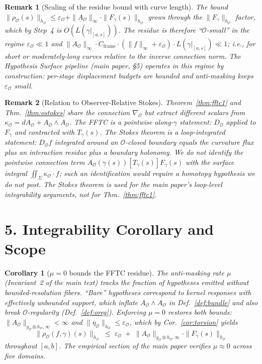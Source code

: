 \documentclass[11pt]{article}
\newtheorem{corollary}{Corollary}
\newtheorem{remark}{Remark}
\newcommand{\Obs}{\mathcal{O}}
\newcommand{\Eps}{\varepsilon_{\Obs}}
\newcommand{\kappaO}{\kappa_{\Obs}}
\newcommand{\resO}{\rho_{\Obs}}
\newcommand{\nablaO}{\nabla_{\Obs}}
\newcommand{\AO}{A_{\Obs}}
\newcommand{\gO}{g_{\Obs}}
\newcommand{\hO}{h_{\Obs}}
\newcommand{\mask}{\mu}
\newcommand{\DO}{D_{\Obs}}
\newcommand{\Cframe}{C_{\mathrm{frame}}}
\begin{document}
\begin{remark}[Scaling of the residue bound with curve length]
\label{rem:residue-scale}
The bound $\|\resO(s)\|_{\hO} \leq \Eps + \|\AO\|_\infty \cdot \|F_\gamma(s)\|_{\hO}$
grows through the $\|F_\gamma\|_{\hO}$ factor, which by Step~4 is
$O(L(\gamma|_{[a,s]}))$. The residue is therefore ``$\Obs$-small'' in
the regime $\Eps \ll 1$ and
$\|\AO\|_\infty \cdot \Cframe \cdot (\|f\|_\infty + \Eps) \cdot L(\gamma|_{[a,s]}) \ll 1$;
i.e., for short or moderately-long curves relative to the inverse
connection norm. The Hypothesis Surface pipeline (main paper, \S5)
operates in this regime by construction: per-stage displacement
budgets are bounded and anti-masking keeps $\Eps$ small.
\end{remark}

\begin{remark}[Relation to Observer-Relative Stokes]
\label{rem:stokes-relation}
Theorem~\ref{thm:fftc1} and Thm.~\ref{thm:ostokes} share the
connection $\nablaO$ but extract different scalars from
$\kappaO = d\AO + \AO \wedge \AO$. The FFTC is a \emph{pointwise
along-$\gamma$} statement: $\DO$ applied to $F_\gamma$ and contracted
with $T_\gamma(s)$. The Stokes theorem is a \emph{loop-integrated}
statement: $\DO f$ integrated around an $\Obs$-closed boundary
equals the curvature flux plus an interaction residue plus a
boundary holonomy. We do \emph{not} identify the pointwise
connection term $\AO(\gamma(s))[T_\gamma(s)] F_\gamma(s)$ with the
surface integral $\iint_\Sigma \kappaO \cdot f$; such an
identification would require a homotopy hypothesis we do not post.
The Stokes theorem is used for the main paper's loop-level
integrability arguments, not for Thm.~\ref{thm:fftc1}.
\end{remark}

\section*{5. Integrability Corollary and Scope}

\begin{corollary}[$\mask = 0$ bounds the FFTC residue]
\label{cor:mask}
The anti-masking rate $\mask$ (Invariant~2 of the main text) tracks
the fraction of hypotheses emitted without bounded-resolution fibers.
``Bare'' hypotheses correspond to kernel responses with effectively
unbounded support, which inflate $\AO \wedge \AO$ in
Def.~\ref{def:bundle} and also break $\Obs$-regularity
(Def.~\ref{def:oreg}). Enforcing $\mask = 0$ restores both bounds:
$\|\AO\|_{\gO \otimes \hO, \infty} < \infty$ and
$\|\eta_\Obs\|_{\hO} \leq \Eps$, which by Cor.~\ref{cor:torsion}
yields
\[
\|\resO(f, \gamma)(s)\|_{\hO}
\;\leq\; \Eps \;+\; \|\AO\|_{\gO \otimes \hO, \infty} \cdot \|F_\gamma(s)\|_{\hO}
\]
throughout $[a, b]$. The empirical section of the main paper
verifies $\mask \approx 0$ across five domains.
\end{corollary}
\end{document}
